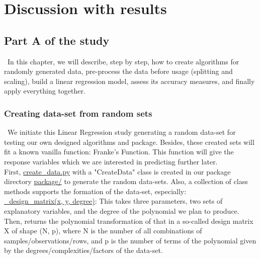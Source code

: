 \section{Discussion with results}
\label{chap:Discussion}

\subsection{Part A of the study}
\label{chap:Part A of the study}

\quad \, In this chapter, we will describe, step by step, how to create algorithms for randomly generated data, pre-process the data before usage (splitting and scaling), build a linear regression model, assess its accuracy measures, and finally apply everything together.\\

\subsubsection{Creating data-set from random sets}
\label{chap:Creating data-set from random sets}

\quad \, We initiate this Linear Regression study generating a random data-set for testing our own designed algorithms and package. Besides, these created sets will fit a known vanilla function: Franke's Function. This function will give the response variables which we are interested in predicting further later.\\

First, \href{https://github.com/fabiorodp/UiO-FYS-STK4155/blob/master/Project1/package/Create_data.py}{create\_data.py} with a "CreateData" class is created in our package directory \href{https://github.com/fabiorodp/UiO-FYS-STK4155/tree/master/Project1/package}{package/} to generate the random data-sets. Also, a collection of class methods supports the formation of the data-set, especially:\\

\href{https://github.com/fabiorodp/UiO-FYS-STK4155/blob/master/Project1/package/Create_data.py}{\_design\_matrix(x, y, degree)}: This takes three parameters, two sets of explanatory variables, and the degree of the polynomial we plan to produce. Then, returns the polynomial transformation of that in a so-called design matrix X of shape (N, p), where N is the number of all combinations of samples/observations/rows, and p is the number of terms of the polynomial given by the degrees/complexities/factors of the data-set.\\

